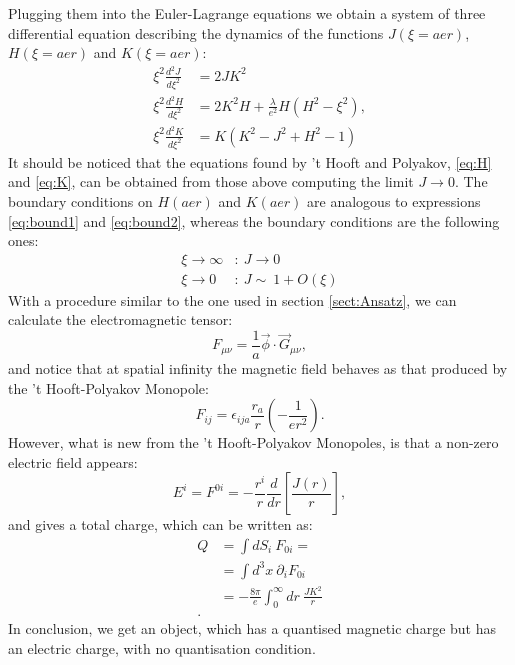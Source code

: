 \documentclass[main.tex]{subfiles}
\begin{document}
  Plugging  them into the Euler-Lagrange equations we obtain a system of three differential equation describing the dynamics of the functions $J(\xi = aer)$, $H(\xi = aer)$ and $K(\xi = aer)$: 
    \begin{align}
  \xi ^2 \frac{d^2 J}{d \xi^2} &= 2JK^2   \label{eq:J2}\\
  \xi ^2 \frac{d^2 H}{d \xi^2} &= 2K^2H + \frac{\lambda}{e^2}H (H^2 -\xi^2), \label{eq:K2}\\
  \xi ^2 \frac{d^2 K}{d \xi^2} &= K \left( K ^2 -J^2 + H^2 -1   \right)  \label{eq:K2}
  \end{align}
 It should be noticed that the equations found by 't Hooft and Polyakov, \ref{eq:H} and \ref{eq:K}, can be obtained from those above computing the limit $J \to 0$.
 The boundary conditions on $H(aer)$ and $K(aer)$ are analogous to expressions \ref{eq:bound1} and \ref{eq:bound2}, whereas the boundary conditions are the following ones: 
   \begin{align}
 \xi \to \infty &\colon  \ J \to 0     \label{eq:bound3}\\
 \xi  \to 0   &\colon  \ J \sim \ 1 + O(\xi)  \label{eq:bound4}
  \end{align}
\medskip
With a procedure similar to the one used in section \ref{sect:Ansatz}, we can calculate the electromagnetic tensor: 
\begin{equation}
 F_{\mu \nu} = \frac{1}{a} \vec{\phi} \cdot \vec{G}_{\mu \nu },
\end{equation}
and notice that at spatial infinity the magnetic field behaves as that produced by the 't Hooft-Polyakov Monopole: 
\begin{equation}
F_{ij}= \epsilon_{ija} \frac{r_a}{r} \left(   - \frac{1}{er^2}    \right).
\end{equation}
However, what is new from the 't Hooft-Polyakov Monopoles, is that a non-zero electric field appears: 
\begin{equation}
E^i = F^{0i}= - \frac{r^i}{r} \frac{d}{dr} \left[ \frac{J(r)}{r} \right],
\end{equation}
and gives a total charge, which can be written as: 
\begin{equation}
\begin{split}
Q &= \int dS_i \  F_{0i} = \\
  &= \int d^3 x \ \partial_i F_{0i}\\
  &= - \frac{8 \pi }{e}\int_0^{\infty} dr \ \frac{JK^2}{r}\\.
\end{split}
\end{equation}
In conclusion, we get an object, which has a quantised magnetic charge but has an electric charge, with no quantisation condition. 
\end{document}
